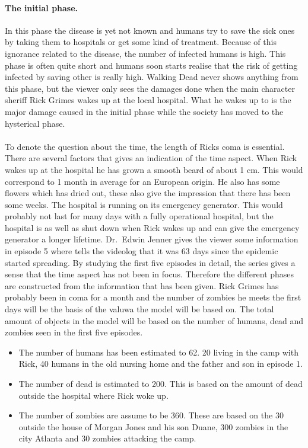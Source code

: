 \documentclass[%
twoside,                 %
final,                   %
10pt]{article}
\begin{document}
\paragraph{The initial phase.}
In this phase the disease is yet not known and humans try to save the sick ones by taking them to hospitals or get some kind of treatment. Because of this ignorance related to the disease, the number of infected humans is high. This phase is often quite short and humans soon starts realise that the risk of getting infected by saving other is really high. Walking Dead never shows anything from this phase, but the viewer only sees the damages done when the main character sheriff Rick Grimes wakes up at the local hospital. What he wakes up to is the major damage caused in the initial phase while the society has moved to the hysterical phase.
\\
\\
 To denote the question about the time, the length of Ricks coma is essential. There are several factors that gives an indication of the time aspect. When Rick wakes up at the hospital he has grown a smooth beard of about 1 cm. This would correspond to 1 month in average for an European origin. He also has some flowers which has dried out, these also give the impression that there has been some weeks. The hospital is running on its emergency generator. This would probably not last for many days with a fully operational hospital, but the hospital is as well as shut down when Rick wakes up and can give the emergency generator a longer lifetime. Dr.~Edwin Jenner gives the viewer some information in episode 5 where tells the videolog that it was 63 days since the epidemic started spreading. By studying the first five episodes in detail, the series gives a sense that the time aspect has not been in focus. Therefore the different phases are constructed from the information that has been given. Rick Grimes has probably been in coma for a month and the number of zombies he meets the first days will be the basis of the valuwa the model will be based on. The total amount of objects in the model will be based on the number of humans, dead and zombies seen in the first five episodes. 
\begin{itemize}
 \item The number of humans has been estimated to 62. 20 living in the camp with Rick, 40 humans in the old nursing home and the father and son in episode 1. 

 \item The number of dead is estimated to 200. This is based on the amount of dead outside the hospital where Rick woke up. 

 \item The number of zombies are assume to be 360. These are based on the 30 outside the house of Morgan Jones and his son Duane, 300 zombies in the city Atlanta and 30 zombies attacking the camp. 
\end{itemize}
\end{document}
